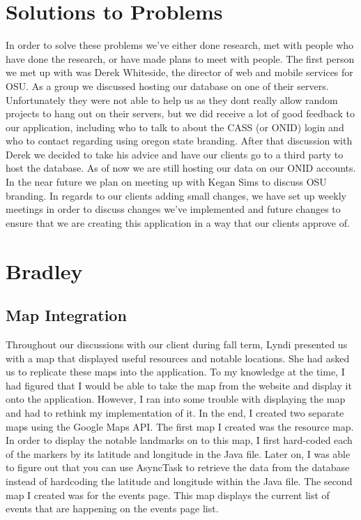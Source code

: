 \documentclass[onecolumn, draftclsnofoot,10pt, compsoc]{IEEEtran}
\begin{document}
\section{Solutions to Problems}
	In order to solve these problems we’ve either done research, met with people who have done the research, or have made plans to meet with people. The first person we met up with was Derek Whiteside, the director of web and mobile services for OSU. As a group we discussed hosting our database on one of their servers. Unfortunately they were not able to help us as they dont really allow random projects to hang out on their servers, but we did receive a lot of good feedback to our application, including who to talk to about the CASS (or ONID) login and who to contact regarding using oregon state branding. After that discussion with Derek we decided to take his advice and have our clients go to a third party to host the database. As of now we are still hosting our data on our ONID accounts. In the near future we plan on meeting up with Kegan Sims to discuss OSU branding.  In regards to our clients adding small changes, we have set up weekly meetings in order to discuss changes we’ve implemented and future changes to ensure that we are creating this application in a way that our clients approve of.

\newpage
\section{Bradley}
	\subsection{Map Integration}
		Throughout our discussions with our client during fall term, Lyndi presented us with a map that displayed useful resources and notable locations. She had asked us to replicate these maps into the application. To my knowledge at the time, I had figured that I would be able to take the map from the website and display it onto the application. However, I ran into some trouble with displaying the map and had to rethink my implementation of it. In the end, I created two separate maps using the Google Maps API. The first map I created was the resource map. In order to display the notable landmarks on to this map, I first hard-coded each of the markers by its latitude and longitude in the Java file. Later on, I was able to figure out that you can use AsyncTask to retrieve the data from the database instead of hardcoding the latitude and longitude within the Java file. The second map I created was for the events page. This map displays the current list of events that are happening on the events page list. \\ \\
\end{document}
